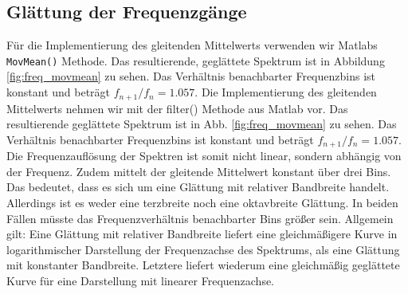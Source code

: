 \subsection{Glättung der Frequenzgänge}
\label{subsec:b}
Für die Implementierung des gleitenden Mittelwerts verwenden wir Matlabs \texttt{MovMean()} Methode.
Das resultierende, geglättete Spektrum ist in Abbildung \ref{fig:freq_movmean} zu sehen. Das Verhältnis benachbarter Frequenzbins ist konstant und beträgt $f_{n+1}/f_{n} = 1.057$.
Die Implementierung des gleitenden Mittelwerts nehmen wir mit der filter() Methode aus Matlab vor.
Das resultierende geglättete Spektrum ist in Abb. \ref{fig:freq_movmean} zu sehen. Das Verhältnis benachbarter Frequenzbins ist konstant und beträgt $f_{n+1}/f_{n} = 1.057$.
Die Frequenzauflösung der Spektren ist somit nicht linear, sondern abhängig von der Frequenz.
Zudem mittelt der gleitende Mittelwert konstant über drei Bins.
Das bedeutet, dass es sich um eine Glättung mit relativer Bandbreite handelt.
Allerdings ist es weder eine terzbreite noch eine oktavbreite Glättung.
In beiden Fällen müsste das Frequenzverhältnis benachbarter Bins größer sein.
Allgemein gilt: Eine Glättung mit relativer Bandbreite liefert eine gleichmäßigere Kurve in logarithmischer Darstellung der Frequenzachse des Spektrums, als eine Glättung mit konstanter Bandbreite.
Letztere liefert wiederum eine gleichmäßig geglättete Kurve für eine Darstellung mit linearer Frequenzachse.

